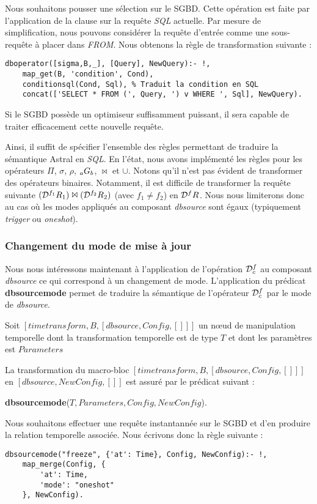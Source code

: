 \begin{example}
    Nous souhaitons pousser une sélection sur le SGBD. Cette opération est faite par l'application de la clause  sur la requête \textit{SQL} actuelle. Par mesure de simplification, nous pouvons considérer la requête d'entrée comme une sous-requête à placer dans \textit{FROM}. Nous obtenons la règle de transformation suivante :
    \begin{lstlisting}
dboperator([sigma,B,_], [Query], NewQuery):- !,
    map_get(B, 'condition', Cond),
    conditionsql(Cond, Sql), % Traduit la condition en SQL
    concat(['SELECT * FROM (', Query, ') v WHERE ', Sql], NewQuery).
    \end{lstlisting}

    Si le SGBD possède un optimiseur suffisamment puissant, il sera capable de traiter efficacement cette nouvelle requête.
\end{example}

Ainsi, il suffit de spécifier l'ensemble des règles permettant de traduire la sémantique Astral en \textit{SQL}. En l'état, nous avons implémenté les règles pour les opérateurs $\Pi$, $\sigma$, $\rho$, $\null_a G_b$, $\Join$ et $\cup$. Notons qu'il n'est pas évident de transformer des opérateurs binaires. Notamment, il est difficile de transformer la requête suivante $(\mathcal{D}^{f_1} R_1)\Join (\mathcal{D}^{f_2} R_2)$ (avec $f_1\neq f_2$) en $\mathcal{D}^{f} R$. Nous nous limiterons donc au cas où les modes appliqués au composant \textit{dbsource} sont égaux (typiquement \textit{trigger} ou \textit{oneshot}).

\subsubsection{Changement du mode de mise à jour}
Nous nous intéressons maintenant à l'application de l'opération $\mathcal{D}^f_c$ au composant \textit{dbsource} ce qui correspond à un changement de mode. L'application du prédicat \textbf{dbsourcemode} permet de traduire la sémantique de l'opérateur $\mathcal{D}^f_c$ par le mode de \textit{dbsource}.
\begin{regle}
    Soit $[timetransform,B,[dbsource, Config, []]]$ un nœud de manipulation temporelle dont la transformation temporelle est de type $T$ et dont les paramètres est $Parameters$

    La transformation du macro-bloc $[timetransform,B,[dbsource, Config, []]]$ en $[dbsource,NewConfig,[]]$ est assuré par le prédicat suivant :
    \begin{center} \textbf{dbsourcemode}($T, Parameters, Config, NewConfig$).\end{center}
\end{regle}
\begin{example}
    Nous souhaitons effectuer une requête instantannée sur le SGBD et d'en produire la relation temporelle associée. Nous écrivons donc la règle suivante :
    \begin{lstlisting}
dbsourcemode("freeze", {'at': Time}, Config, NewConfig):- !,
    map_merge(Config, {
        'at': Time,
        'mode': "oneshot"
    }, NewConfig).
    \end{lstlisting}
\end{example}


